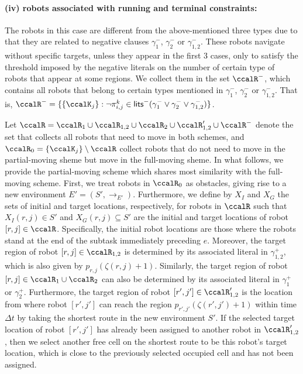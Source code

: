 \documentclass[Afour,sageh,times]{sagej}
\renewcommand{\ap}[3]{\mathcal{\pi}_{{#1},{#2}}^{#3}}
\begin{document}
{\paragraph{(iv) robots associated with running and terminal constraints:} The robots in this case  are different from the above-mentioned three types due to that they are related to negative clauses $\gamma_1^-$, $\gamma_2^-$ or $\gamma_{1,2}^-$. These robots navigate without specific targets, unless they appear in the first 3 cases, only to satisfy the threshold imposed by the negative literals on the number of certain type of robots that appear at some regions. We collect them in the set $\ccalR^-$, which contains all robots that belong to certain types mentioned in $\gamma_1^-$, $\gamma_2^-$ or $\gamma_{1,2}^-$. That is, $\ccalR^- = \{\{\ccalK_j\}: \neg \ap{i}{j}{k} \in \mathsf{lits}^- (\gamma_1^- \vee \gamma_2^- \vee \gamma_{1,2}^-) \}$.

Let $\ccalR = \ccalR_1 \cup\ccalR_{1,2} \cup \ccalR_{2} \cup \ccalR'_{1,2} \cup \ccalR^-$ denote the set that collects all robots that need to move in both schemes, and $\ccalR_0 = \{\ccalK_j\}\setminus\ccalR$ collect robots that do not need to move in the partial-moving sheme but move in the full-moving sheme. In what follows, we provide the partial-moving scheme which shares most similarity with the full-moving scheme. First, we treat robots in $\ccalR_0$ as obstacles, giving rise to a new environment $E'=(S', \to_{E'})$. Furthermore, we define by $X_I$ and $X_G$ the sets of initial and target locations, respectively, for robots in $\ccalR$  such that $X_I(r,j) \in S'$ and $X_G(r,j)\subseteq S'$ are the initial  and target locations of robot $[r,j] \in \ccalR$. Specifically, the initial robot locations are those where the robots stand at the end of the subtask immediately preceding $e$. Moreover, the target region of  robot $[r,j] \in \ccalR_{1,2}$ is determined  by its associated literal in $\gamma_{1,2}^+$, which is also given by  $p_{r,j}(\zeta(r,j)+1)$. Similarly, the target region of robot $[r,j] \in \ccalR_{1} \cup \ccalR_{2}$ can also be determined by its associated literal in $\gamma_1^+$ or $\gamma_2^+$. Furthermore, the target region of robot $[r',j'] \in \ccalR'_{1,2}$ is the  location from where robot $[r',j']$ can reach the region $p_{r',j'}(\zeta(r',j')+1)$ within time $\Delta t$ by taking the shortest route in the new environment $S'$. If the selected target location of robot $[r',j']$ has already been assigned to another robot in $\ccalR'_{1,2}$, then we select another free cell on the shortest route to be this robot's target location, which is close to the previously selected occupied cell and has not been assigned.

}
\end{document}
